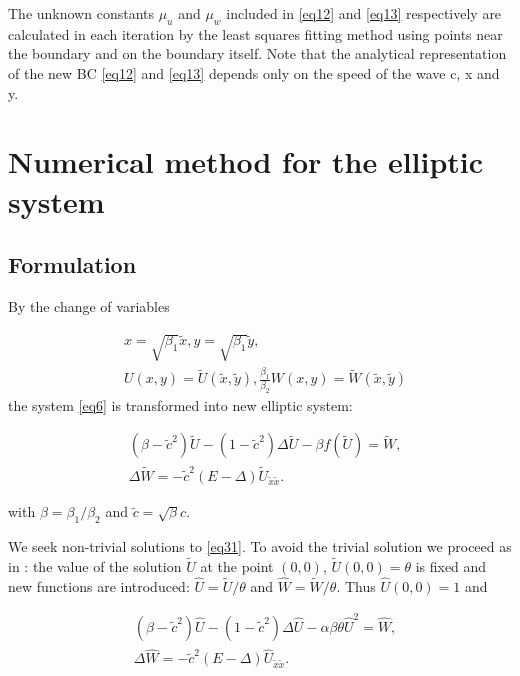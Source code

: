 \documentclass[12pt]{article}
\theoremstyle{theorem}
\theoremstyle{defi}
\begin{document}
The unknown constants $\mu_u$ and $\mu_w$ included in \ref{eq12} and \ref{eq13} respectively are calculated in each iteration by the least squares fitting method using points near the boundary and on the boundary itself.
 Note that  the analytical representation of the new BC \ref{eq12} and \ref{eq13} depends only on the speed of the wave c, x and y.

\section{Numerical method for the elliptic system}

\subsection{Formulation}


By the change of variables

\begin{equation}\label{eqVCN}
\begin{split}
&x=\sqrt{\beta_1} { \tilde{x} }, y=\sqrt{\beta_1} { \tilde{ y} },\\
&U(x,y)= \tilde U({ \tilde{x} },{ \tilde{y} } ), \frac{\beta_1}{\beta_2} W(x,y)=  \tilde W({ \tilde{x} },{ \tilde{y} } )
\end{split}
\end{equation}
 the system \ref{eq6} is transformed into new elliptic system:

\begin{equation}\label{eq31}
\begin{split}
&(\beta-\tilde c ^2) \tilde U  -(1- \tilde c^2) \Delta \tilde U - \beta f( \tilde U ) = \tilde W, \\
&\Delta \tilde W =  - \tilde c^2 (E- \Delta) \tilde U_{\tilde x \tilde x}. 
\end{split}
\end{equation}

with $\beta = \beta_1 / \beta_2$ and $ \tilde c = \sqrt {\beta} c$.

We  seek  non-trivial solutions to \ref{eq31}. To avoid the trivial solution we proceed as in \cite{ref6}: the value of the solution $\tilde U$ at the point $(0,0)$,  $\tilde U(0,0)=\theta $ is fixed and new  functions are introduced: $\widehat{U}=\tilde U /{\theta} $ and $\widehat{W}=\tilde W /{\theta} $. Thus  
$ \widehat{U}(0,0)=1$ and 

\begin{equation}\label{eq32}
\begin{split}
& (\beta-\tilde c^2) \widehat{U}  -(1-\tilde c^2) \Delta \widehat{U} - \alpha \beta \theta \widehat{U}^2 = \widehat{W}, \\
&\Delta \widehat{W} = - \tilde c^2 (E- \Delta) \widehat{U}_{\tilde x \tilde x}.
\end{split}
\end{equation}
\end{document}

